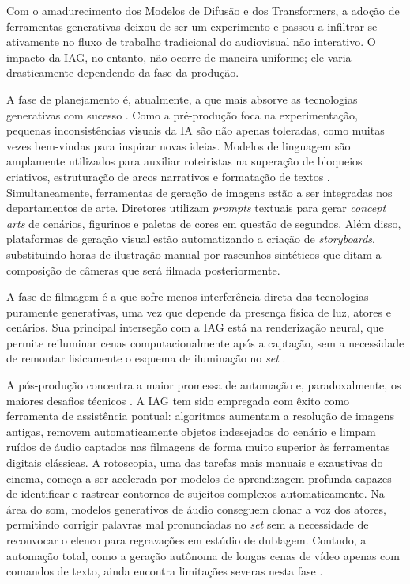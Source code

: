 Com o amadurecimento dos Modelos de Difusão e dos Transformers, a adoção de ferramentas generativas deixou de ser um experimento e passou a infiltrar-se ativamente no fluxo de trabalho tradicional do audiovisual não interativo. O impacto da IAG, no entanto, não ocorre de maneira uniforme; ele varia drasticamente dependendo da fase da produção.

A fase de planejamento é, atualmente, a que mais absorve as tecnologias generativas com sucesso \citep{voinea2025}. Como a pré-produção foca na experimentação, pequenas inconsistências visuais da IA são não apenas toleradas, como muitas vezes bem-vindas para inspirar novas ideias.
Modelos de linguagem são amplamente utilizados para auxiliar roteiristas na superação de bloqueios criativos, estruturação de arcos narrativos e formatação de textos \citep{dwivedi2023chatgpt}. Simultaneamente, ferramentas de geração de imagens estão a ser integradas nos departamentos de arte. Diretores utilizam \textit{prompts} textuais para gerar \textit{concept arts} de cenários, figurinos e paletas de cores em questão de segundos. Além disso, plataformas de geração visual estão automatizando a criação de \textit{storyboards}, substituindo horas de ilustração manual por rascunhos sintéticos que ditam a composição de câmeras que será filmada posteriormente.

A fase de filmagem é a que sofre menos interferência direta das tecnologias puramente generativas, uma vez que depende da presença física de luz, atores e cenários. Sua principal interseção com a IAG está na renderização neural, que permite reiluminar cenas computacionalmente após a captação, sem a necessidade de remontar fisicamente o esquema de iluminação no \textit{set} \citep{einabadi2021relighting}.

A pós-produção concentra a maior promessa de automação e, paradoxalmente, os maiores desafios técnicos \citep{gavran2025}. A IAG tem sido empregada com êxito como ferramenta de assistência pontual: algoritmos aumentam a resolução de imagens antigas, removem automaticamente objetos indesejados do cenário e limpam ruídos de áudio captados nas filmagens de forma muito superior às ferramentas digitais clássicas.
A rotoscopia, uma das tarefas mais manuais e exaustivas do cinema, começa a ser acelerada por modelos de aprendizagem profunda capazes de identificar e rastrear contornos de sujeitos complexos automaticamente. Na área do som, modelos generativos de áudio conseguem clonar a voz dos atores, permitindo corrigir palavras mal pronunciadas no \textit{set} sem a necessidade de reconvocar o elenco para regravações em estúdio de dublagem. Contudo, a automação total, como a geração autônoma de longas cenas de vídeo apenas com comandos de texto, ainda encontra limitações severas nesta fase \citep{yin2025spatiotemporal}.


